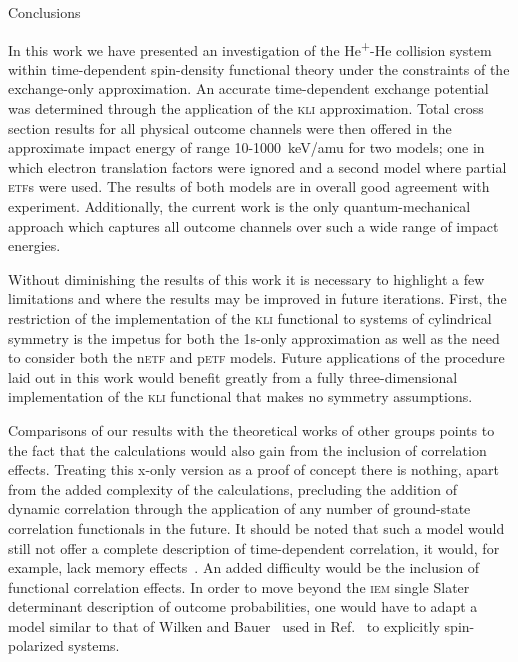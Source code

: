 \documentclass[aps, pra, reprint, groupedaddress, amsfonts, longbibliography,
               amsmath, amssymb, showpacs, nofootinbib]{revtex4-1}
\begin{document}
\begin{section}{Conclusions \label{sec:conc}}

   In this work we have presented an investigation of the He\textsuperscript{+}-He collision system
   within  time-dependent spin-density functional theory under the constraints of the exchange-only
   approximation. An accurate time-dependent exchange potential was determined through the application
   of the \textsc{kli} approximation. Total cross section results for all physical outcome channels were
   then offered in the approximate impact energy of range 10-1000~keV/amu for two models; one in which
   electron translation factors were ignored and a second model where partial \textsc{etf}s were used.
   The results of both models are in overall good agreement with experiment. Additionally, the current
   work is the only quantum-mechanical approach which captures all outcome channels over such a
   wide range of impact energies.

   Without diminishing the results of this work it is necessary to highlight a few limitations and where
   the results may be improved in future iterations. First, the restriction of the implementation of the 
   \textsc{kli} functional to systems of cylindrical symmetry is the impetus for both the 1s-only
   approximation as well as the need to consider both the n\textsc{etf} and p\textsc{etf} models. Future
   applications of the procedure laid out in this work would benefit greatly from a fully
   three-dimensional implementation of the \textsc{kli} functional that makes no symmetry assumptions.

   Comparisons of our results with the theoretical works of other groups points to the fact that the
   calculations would also gain from the inclusion of correlation effects. Treating this x-only version
   as a proof of concept there is nothing, apart from the added complexity of the calculations,
   precluding the addition of dynamic correlation through the application of any number of ground-state
   correlation functionals in the future. It should be noted that such a model would still not offer a
   complete description of time-dependent correlation, it would, for example, lack memory
   effects~\cite{tddft}. An added difficulty would be the inclusion of functional correlation effects.
   In order to move beyond the \textsc{iem} single Slater determinant description of outcome
   probabilities, one would have to adapt a model similar to that of Wilken and Bauer~\cite{wb} used in
   Ref.~\cite{p-he2p-he} to explicitly spin-polarized systems.

\end{section}
\end{document}
